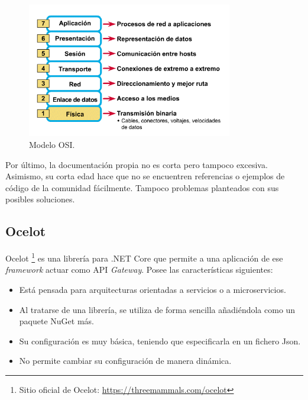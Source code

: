 \documentclass[11pt,spanish,listoffigures]{tfgetsinf}
\begin{document}
\begin{figure}[ht]
\centering
\includegraphics[width=0.8\textwidth]{imagenes/modeloOSI}
\caption{Modelo OSI.}
	\label{modeloOSI}
\end{figure}

Por último, la documentación propia no es corta pero tampoco excesiva. Asimismo, su corta edad hace que no se encuentren referencias o ejemplos de código de la comunidad fácilmente. Tampoco problemas planteados con sus posibles soluciones.


		\subsection{Ocelot}
		
Ocelot \footnote{Sitio oficial de Ocelot: \url{https://threemammals.com/ocelot}} es una librería para .NET Core que permite a una aplicación de ese \emph{framework} actuar como API \emph{Gateway}. Posee las características siguientes:

\begin{itemize}

	\item Está pensada para arquitecturas orientadas a servicios o a microservicios.
	
	\item Al tratarse de una librería, se utiliza de forma sencilla añadiéndola como un paquete NuGet más.
	
	\item Su configuración es muy básica, teniendo que especificarla en un fichero Json.
	
	\item No permite cambiar su configuración de manera dinámica.

\end{itemize}
\end{document}
